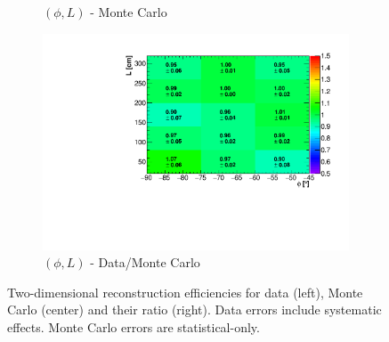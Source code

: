 \documentclass[a4paper,11pt]{article}
\begin{document}
\begin{figure}[htbp]
\begin{subfigure}{0.32\textwidth}
\caption{$(\phi,L)$ - Monte Carlo}
\end{subfigure}\begin{subfigure}{0.32\textwidth}
\includegraphics[width=\linewidth]{figures/phi_l.pdf}
\caption{$(\phi,L)$ - Data/Monte Carlo}
\end{subfigure}
\caption{Two-dimensional reconstruction efficiencies for data (left), Monte Carlo (center) and their ratio (right). Data errors include systematic effects. Monte Carlo errors are statistical-only.}\label{fig:2d}
\end{figure}
\end{document}
